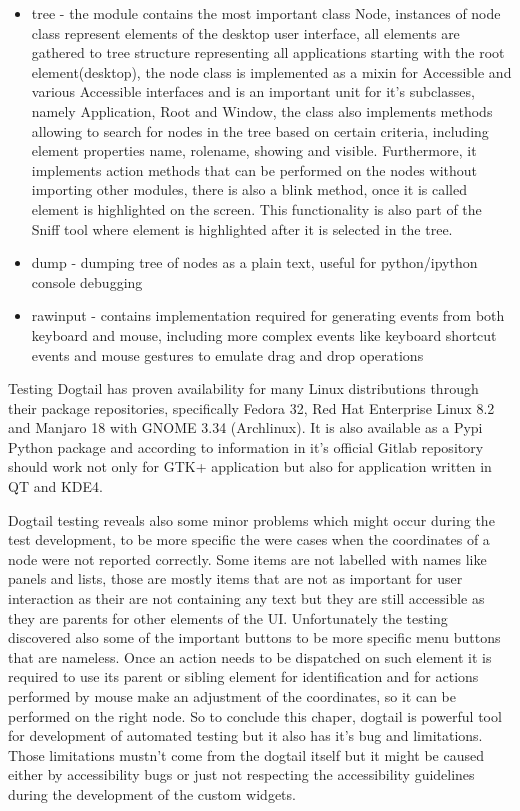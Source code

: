 \begin{itemize}
    \item tree - the module contains the most important class Node, instances of node class represent elements of the desktop user interface, all elements are gathered to tree structure representing all applications starting with the root element(desktop), the node class is implemented as a mixin for Accessible and various Accessible interfaces and is an important unit for it's subclasses, namely Application, Root and Window, the class also implements methods allowing to search for nodes in the tree based on certain criteria, including element properties name, rolename, showing and visible. Furthermore, it implements action methods that can be performed on the nodes without importing other modules, there is also a blink method, once it is called element is highlighted on the screen. This functionality is also part of the Sniff tool where element is highlighted after it is selected in the tree.    
    \item dump - dumping tree of nodes as a plain text, useful for python/ipython console debugging
    \item rawinput - contains implementation required for generating events from both keyboard and mouse, including more complex events like keyboard shortcut events and mouse gestures to emulate drag and drop operations  
\end{itemize}

 Testing Dogtail has proven availability for many Linux distributions through their package repositories, specifically Fedora 32, Red Hat Enterprise Linux 8.2 and Manjaro 18 with GNOME 3.34 (Archlinux). It is also available as a Pypi Python package and according to information in it's official Gitlab repository should work not only for GTK+ application but also for application written in QT and KDE4. 
 
 Dogtail testing reveals also some minor problems which might occur during the test development, to be more specific the were cases when the coordinates of a node were not reported correctly. Some items are not labelled with names like panels and lists, those are mostly items that are not as important for user interaction as their are not containing any text but they are still accessible as they are parents for other elements of the UI. Unfortunately the testing discovered also some of the important buttons to be more specific menu buttons that are nameless. Once an action needs to be dispatched on such element it is required to use its parent or sibling element for identification and for actions performed by mouse make an adjustment of the coordinates, so it can be performed on the right node. So to conclude this chaper, dogtail is powerful tool for development of automated testing but it also has it's bug and limitations. Those limitations mustn't come from the dogtail itself but it might be caused either by accessibility bugs or just not respecting the accessibility guidelines during the development of the custom widgets. 

